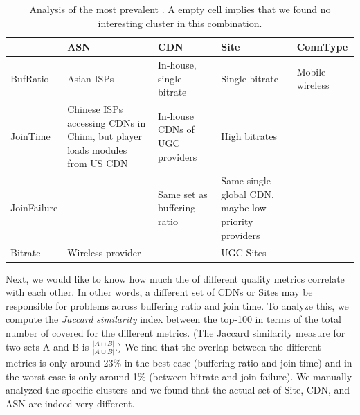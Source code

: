 \begin{table}[t]
\begin{center}
\begin{small}
\begin{tabular}{p{1.5cm}|p{3.5cm}|p{2.5cm}|p{3.5cm}|p{2.5cm}}
		& ASN &  CDN   & Site  & ConnType  \\ \hline 

BufRatio	 & Asian ISPs  & In-house, single bitrate   & Single bitrate &  Mobile wireless  \\   \hline
JoinTime 	&  Chinese ISPs accessing CDNs in China, but player loads modules from US CDN	& In-house CDNs of UGC providers & High bitrates  \\  \hline 
JoinFailure 	&   & Same set as buffering ratio & Same single global CDN, maybe low priority providers &  \\ \hline 
Bitrate 	& Wireless provider &   & UGC Sites &    
\end{tabular}
\end{small}
\end{center}
\caption{Analysis of the most  prevalent \criticalclusters. 
A empty cell implies that we found no interesting 
 cluster in this combination.}
\label{tab:depth}
\end{table}


Next, we would like to know how much the \criticalclusters
of different quality metrics correlate with each other.
In other words, a different set of CDNs or Sites may 
be responsible for problems across buffering ratio and
join time. 
To analyze this, we compute the \emph{Jaccard similarity} 
index between the top-100 in terms of the total number 
of \problemsessions covered  \criticalclusters  
for the different metrics. 
(The Jaccard similarity measure for two sets A and B 
is $\frac{|A \cap B|}{|A \cup B|}$.)
We find that the overlap between the different 
metrics is only around 23\% in the best case (buffering 
ratio and join time) and in the worst case is only around
1\% (between bitrate and join failure).  
We manually analyzed the specific clusters and we 
found that  the actual set of Site, CDN, and ASN
\criticalclusters are indeed very different.  


